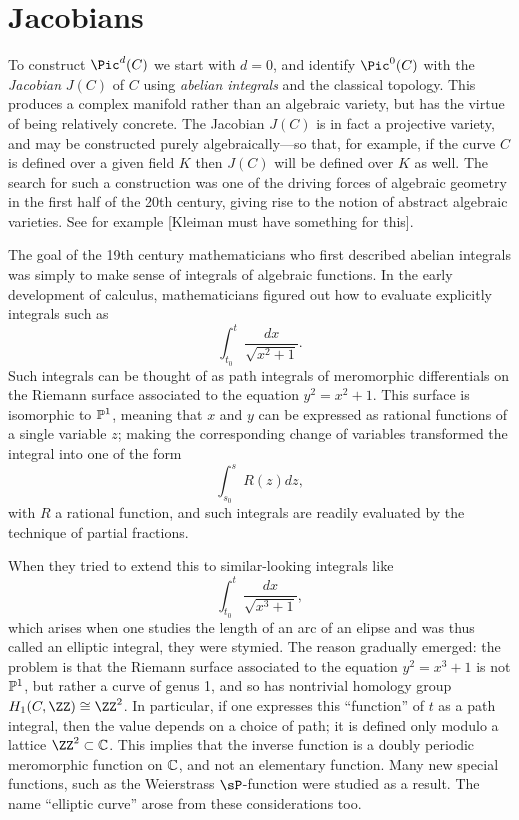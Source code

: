 \section{Jacobians}

To construct $\Pic^d(C)$ we start with $d=0$, and identify $\Pic^0(C)$ with  the \emph{Jacobian} $J(C)$ of $C$ using \emph{abelian integrals} and the classical topology. This produces a complex manifold rather than an algebraic variety, but has the virtue of being relatively concrete.  The Jacobian $J(C)$ is in fact a projective variety, and may be constructed purely algebraically---so that, for example, if the curve $C$ is defined over a given field $K$ then $J(C)$ will be defined over $K$ as well. The search for such a construction was one of the driving forces of algebraic geometry in the first half of the 20th century, giving rise to the notion of abstract algebraic varieties. See for example \cite{??s} [Kleiman must have something for this].

The goal of the 19th century mathematicians who first described abelian integrals was simply to make sense of integrals of algebraic functions. In the early development of calculus, mathematicians figured out how to evaluate explicitly integrals such as
$$
\int_{t_0}^t \frac{dx}{\sqrt{x^2+1}}.
$$
Such integrals can be thought of as path integrals of meromorphic differentials on the Riemann surface associated to the equation $y^2 = x^2+1$. This surface is isomorphic to $\PP^1$, meaning that $x$ and $y$ can be expressed as rational functions of a single variable $z$; making the corresponding change of variables transformed the integral into one of the form
$$
\int_{s_0}^s R(z)dz,
$$
with $R$ a rational function, and such integrals are readily evaluated by the technique of partial fractions.

When they tried to extend this to similar-looking integrals like
$$
\int_{t_0}^t \frac{dx}{\sqrt{x^3+1}},
$$
which arises when one studies the length of an arc of an elipse and was thus called an elliptic integral, they were stymied. The reason gradually emerged: the problem is that the Riemann surface associated to the equation $y^2 = x^3+1$ is not $\PP^1$, but rather a curve of genus 1, and so has nontrivial homology group $H_1(C, \ZZ) \cong \ZZ^2$. In particular, if one expresses this ``function'' of $t$  as a path integral, then the value depends on a choice of path; it is defined only modulo a lattice $\ZZ^2 \subset \CC$. This implies that the inverse function is a doubly periodic meromorphic function on $\CC$, and not an elementary function. Many new special functions, such as the Weierstrass $\sP$-function were studied as a result. The name ``elliptic curve'' arose from these considerations too.

